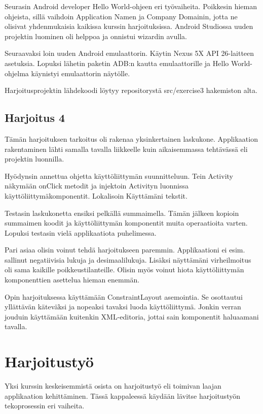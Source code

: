 \documentclass[globalnumbering,centeredcaptions]{tutthesis/tutthesis} %
\begin{document}
Seurasin Android developer Hello World-ohjeen eri työvaiheita. Poikkesin hieman ohjeista, sillä vaihdoin Application Namen ja Company Domainin, jotta ne olisivat yhdenmukaisia kaikissa kurssin harjoituksissa. Android Studiossa uuden projektin luominen oli helppoa ja onnistui wizardin avulla.

Seuraavaksi loin uuden Android emulaattorin. Käytin Nexus 5X API 26-laitteen asetuksia. Lopuksi lähetin paketin ADB:n kautta emulaattorille ja Hello World-ohjelma käynistyi emulaattorin näytölle.

Harjoitusprojektin lähdekoodi löytyy repositorystä src/exercise3 hakemiston alta.

\section{Harjoitus 4}

Tämän harjoituksen tarkoitus oli rakenaa yksinkertainen laskukone. Applikaation rakentaminen lähti samalla tavalla liikkeelle kuin aikaisemmassa tehtävässä eli projektin luonnilla.

Hyödynsin annettua ohjetta käyttöliittymän suunnitteluun. Tein Activity näkymään onClick metodit ja injektoin Activityn luonnissa käyttöliittymäkomponentit. Lokalisoin Käyttämäni tekstit.

Testasin laskukonetta ensiksi pelkällä summaimella. Tämän jälkeen kopioin summaimen koodit ja käyttöliittymän komponentit muita operaatioita varten. Lopuksi testasin vielä applikaatiota puhelimessa.

Pari asiaa olisin voinut tehdä harjoitukseen paremmin. Applikaationi ei esim. sallinut negatiivisia lukuja ja desimaalilukuja. Lisäksi näyttämäni virheilmoitus oli sama kaikille poikkeustilanteille. Olisin myös voinut hiota käyttöliittymän komponenttien asettelua hieman enemmän.

Opin harjoituksessa käyttämään ConstraintLayout asemointia. Se osottautui yllättävän käteväksi ja nopeaksi tavaksi luoda käyttöliittymä. Jonkin verran jouduin käyttämään kuitenkin XML-editoria, jottai sain komponentit haluaamani tavalla.

\chapter{Harjoitustyö}
\label{ch:harjoitustyo}

Yksi kurssin keskeisemmistä osista on harjoitustyö eli toimivan laajan applikaation kehittäminen. Tässä kappaleessä käydään lävitse harjoitustyön tekoprosessin eri vaiheita.
\end{document}
